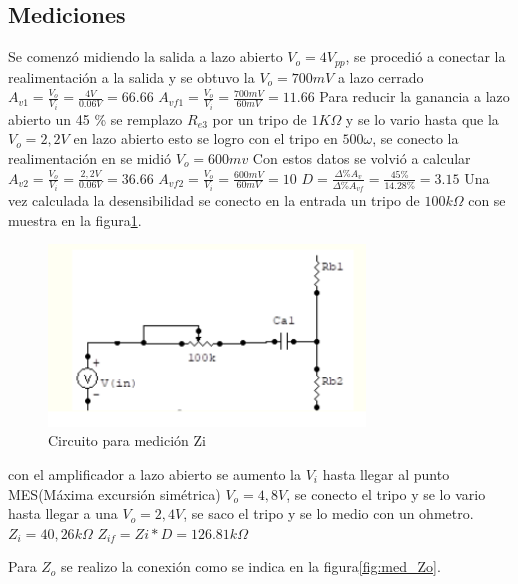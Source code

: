 \documentclass[12pt, letterpaper]{article}
\begin{document}
\subsection{Mediciones}
Se comenzó midiendo la salida a lazo abierto $V_o=4V_{pp}$, se procedió a conectar la realimentación a la salida y se obtuvo la $V_o=700mV$ a lazo cerrado
\singlespacing
$A_{v1}=\frac{V_o}{V_{i}}=\frac{4V}{0.06V}=66.66$
\singlespacing 
$A_{vf1}=\frac{V_o}{V_{i}}=\frac{700mV}{60mV}=11.66$
\singlespacing
Para reducir la ganancia a lazo abierto un 45 \% se remplazo $R_{e3}$ por un tripo de $1K\Omega$ y se lo vario hasta que la $V_o=2,2V$ en lazo abierto esto se logro con el tripo en $500\omega$, se conecto la realimentación en se midió $V_o=600mv$
\singlespacing
Con estos datos se volvió a calcular $A_{v2}=\frac{V_o}{V_{i}}=\frac{2,2V}{0.06V}=36.66$ \singlespacing
$A_{vf2}=\frac{V_o}{V_{i}}=\frac{600mV}{60mV}=10$
\singlespacing
$D=\frac{\Delta \% A_v}{\Delta \% A_{vf}}=\frac{45\%}{14.28\%}=3.15$
\singlespacing
Una vez calculada la desensibilidad se conecto en la entrada un tripo de $100k\Omega$ con se muestra en la figura\ref{fig:med_Zi}.
\singlespacing
\begin{figure}[H]
	\centering
	\includegraphics[width=0.75\textwidth]{Imagenes/zi.png}
	\caption{Circuito para medición Zi}
	\label{fig:med_Zi}
\end{figure}
con el amplificador a lazo abierto se aumento la $V_i$ hasta llegar al punto MES(Máxima excursión simétrica) $V_o=4,8V$, se conecto el tripo y se lo vario hasta llegar a una $V_o=2,4V$, se saco el tripo y se lo medio con un ohmetro.
\singlespacing
$Z_i=40,26k\Omega$
\singlespacing
$Z_{if}=Zi*D=126.81k\Omega$
\singlespacing

Para $Z_o$ se realizo la conexión como se indica en la figura\ref{fig:med_Zo}.
\end{document}
